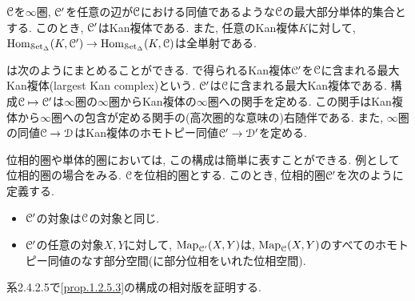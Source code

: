 \documentclass[uplatex, a4paper, 14Q, dvipdfmx]{jsreport}
\begin{document}
\begin{proposition} \label{prop.1.2.5.3}
  $\mathcal{C}$を$\infty$圏, $\mathcal{C}'$を任意の辺が$\mathcal{C}$における同値であるような$\mathcal{C}$の最大部分単体的集合とする. 
  このとき, $\mathcal{C}'$はKan複体である. 
  また, 任意のKan複体$K$に対して, $\mathrm{Hom}_{\mathcal{S}\mathrm{et}_{\Delta}}(K,\mathcal{C}') \to \mathrm{Hom}_{\mathcal{S}\mathrm{et}_{\Delta}}(K,\mathcal{C})$は全単射である. 
\end{proposition}

は次のようにまとめることができる. 
で得られるKan複体$\mathcal{C}'$を$\mathcal{C}$に含まれる最大Kan複体(largest Kan complex)という.
$\mathcal{C}'$は$\mathcal{C}$に含まれる最大Kan複体である. 
構成$\mathcal{C} \mapsto \mathcal{C}'$は$\infty$圏の$\infty$圏からKan複体の$\infty$圏への関手を定める. 
この関手はKan複体から$\infty$圏への包含が定める関手の(高次圏的な意味の)右随伴である. 
また, $\infty$圏の同値$\mathcal{C} \to \mathcal{D}$はKan複体のホモトピー同値$\mathcal{C}' \to \mathcal{D}'$を定める. 

\begin{remark} \label{rem.1.2.5.4}
  位相的圏や単体的圏においては, この構成は簡単に表すことができる. 
  例として位相的圏の場合をみる. 
  $\mathcal{C}$を位相的圏とする. 
  このとき, 位相的圏$\mathcal{C}'$を次のように定義する. 
  \begin{itemize}
    \item $\mathcal{C}'$の対象は$\mathcal{C}$の対象と同じ.
    \item $\mathcal{C}'$の任意の対象$X,Y$に対して, $\mathrm{Map}_{\mathcal{C}'}(X,Y)$は, $\mathrm{Map}_{\mathcal{C}}(X,Y)$のすべてのホモトピー同値のなす部分空間(に部分位相をいれた位相空間). 
  \end{itemize}
\end{remark}

\begin{remark} \label{rem.1.2.5.5}
  系2.4.2.5で\cref{prop.1.2.5.3}の構成の相対版を証明する.
\end{remark}



\begin{remark} \label{rem.1.2.5.6}
  
\end{remark}
\end{document}
